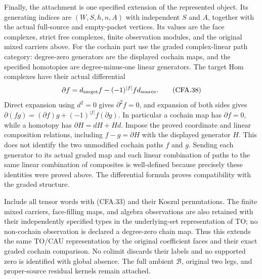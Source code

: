Finally, the attachment is one specified extension of the represented
object.  Its generating indices are $(W,S,h,n,A)$ with independent
$S$ and $A$, together with the actual full-source and empty-packet
vertices.  Its values are the face complexes, strict free complexes,
finite observation modules, and the original mixed carriers above.
For the cochain part use the graded complex-linear path category:
degree-zero generators are the displayed cochain maps, and the
specified homotopies are degree-minus-one linear generators.
The target Hom complexes have their actual differential
\[
 \partial f=d_{\rm target}f-(-1)^{|f|}f d_{\rm source}.
                                                               \tag{CFA.38}
\]
Direct expansion using $d^2=0$ gives $\partial^2f=0$, and expansion
of both sides gives
$\partial(fg)=(\partial f)g+(-1)^{|f|}f(\partial g)$.
In particular a cochain map has $\partial f=0$, while a homotopy
has $\partial H=dH+Hd$.  Impose the proved coordinate and linear
composition relations, including $f-g=\partial H$ with the displayed
generator $H$.  This does not identify the two unmodified cochain
paths $f$ and $g$.  Sending each generator to its actual graded map
and each linear combination of paths to the same linear combination
of composites is well-defined because precisely these identities
were proved above.  The differential formula proves compatibility
with the graded structure.

Include all tensor words with (CFA.33) and their Koszul permutations.
The finite mixed carriers, face-filling maps, and algebra observations
are also retained with their independently specified types in the
underlying-set representation of TO; no non-cochain observation is
declared a degree-zero chain map.  Thus this extends the same TO/CAU
representation by the original coefficient faces and their exact
graded cochain comparison.  No colimit discards their labels and no
supported zero is identified with global absence.  The full ambient
$\mathscr B$, original two legs, and proper-source residual kernels
remain attached.
